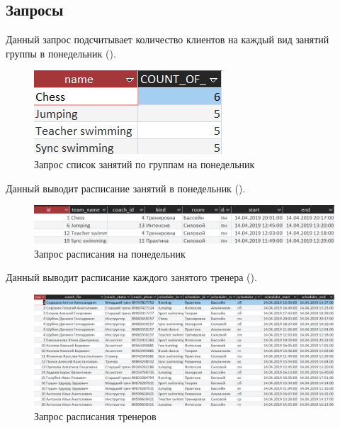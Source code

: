 \documentclass[a4paper,14pt]{article}
\begin{document}
 \subsection{Запросы}

	Данный запрос подсчитывает количество клиентов на каждый вид занятий группы в понедельник ().
	
	\begin{figure}[H]
		\centering		
		\includegraphics[width=0.4\linewidth]{image/5_req_group}
		\caption{Запрос список занятий по группам на понедельник}\label{img:5_req_group}
	\end{figure}
	
	
	
	
	
	Данный выводит расписание занятий в понедельник ().
	
	\begin{figure}[H]
		\centering		
		\includegraphics[width=\linewidth]{image/5_req_scheduler}
		\caption{Запрос расписания на понедельник}\label{img:5_req_scheduler}
	\end{figure}
	
	
	
	
	
	Данный выводит расписание каждого занятого тренера ().
	
	\begin{figure}[H]
		\centering		
		\includegraphics[width=\linewidth]{image/5_req_coach_scheduler}
		\caption{Запрос расписания тренеров}\label{img:5_req_coach_scheduler}
	\end{figure}
	
\end{document}
